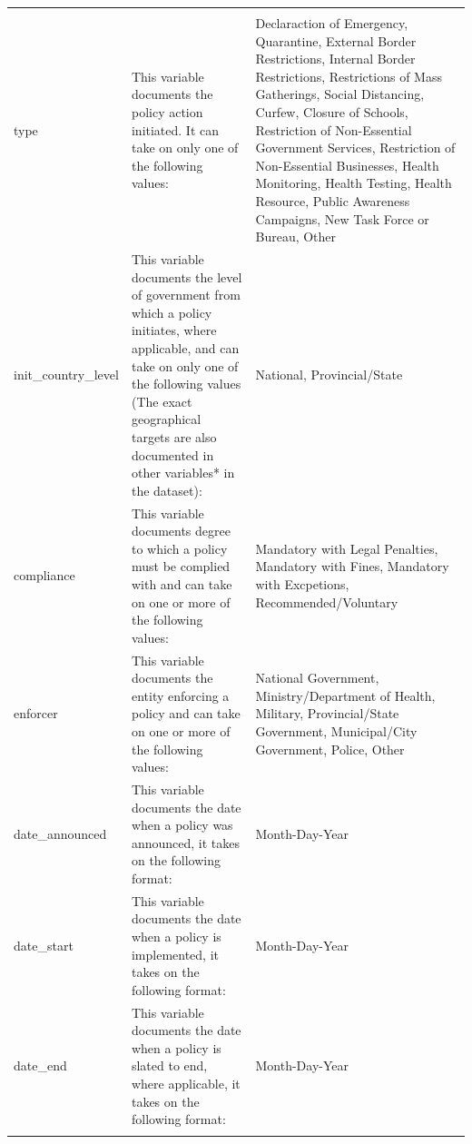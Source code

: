 \documentclass[]{article}
\begin{document}
\begin{ThreePartTable}
\begin{longtable}{>{\bfseries\raggedright\arraybackslash}p{3.5cm}>{\raggedright\arraybackslash}p{5cm}>{\raggedright\arraybackslash}p{8.5cm}}
\multicolumn{3}{l}{\textbf{Monadic Variables}}\\
\hspace{1em}type & This variable documents the policy action initiated. It can take on only one of the following values: & Declaraction of Emergency, Quarantine, External Border Restrictions, Internal Border Restrictions, Restrictions of Mass Gatherings, Social Distancing, Curfew, Closure of Schools, Restriction of Non-Essential Government Services, Restriction of Non-Essential Businesses, Health Monitoring, Health Testing, Health Resource, Public Awareness Campaigns, New Task Force or Bureau, Other\\
\rowcolor{gray!6}  \hspace{1em}init\_country\_level & This variable documents the level of government from which a policy initiates, where applicable, and can take on only one of the following values  (The exact geographical targets are also documented in other variables* in the dataset): & National, Provincial/State\\
\hspace{1em}compliance & This variable documents degree to which a policy must be complied with and can take on one or more of the following values: & Mandatory with Legal Penalties, Mandatory with Fines, Mandatory with Excpetions, Recommended/Voluntary\\
\rowcolor{gray!6}  \hspace{1em}enforcer & This variable documents the entity enforcing a policy and can take on one or more of the following values: & National Government, Ministry/Department of Health, Military, Provincial/State Government, Municipal/City Government, Police, Other\\
\hspace{1em}date\_announced & This variable documents the date when a policy was announced, it takes on the following format: & Month-Day-Year\\
\rowcolor{gray!6}  \hspace{1em}date\_start & This variable documents the date when a policy is implemented, it takes on the following format: & Month-Day-Year\\
\hspace{1em}date\_end & This variable documents the date when a policy is slated to end, where applicable, it takes on the following format: & Month-Day-Year\\
\rowcolor{gray!6}  \addlinespace[0.3em]
\multicolumn{3}{l}{\textbf{Dyadic Variables}}\\

\end{longtable}
\end{ThreePartTable}
\end{document}
